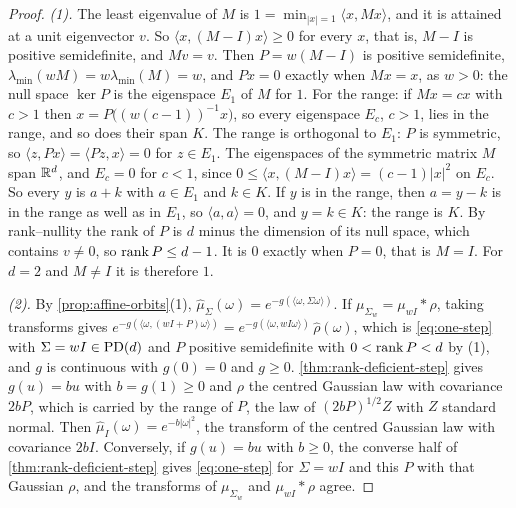 \begin{proof}
\leanok
\emph{(1).} The least eigenvalue of $M$ is $1 = \min_{|x| = 1}\langle x, Mx\rangle$, and it is attained at a unit eigenvector $v$. So $\langle x, (M - I)x\rangle \ge 0$ for
every $x$, that is, $M - I$ is positive semidefinite, and $Mv = v$. Then $P = w(M - I)$ is positive
semidefinite, $\lambda_{\min}(wM) = w\lambda_{\min}(M) = w$, and $Px = 0$ exactly when $Mx = x$, as
$w > 0$: the null space $\ker P$ is the eigenspace $E_1$ of $M$ for $1$. For the range: if $Mx = cx$ with
$c > 1$ then $x = P\bigl((w(c-1))^{-1}x\bigr)$, so every eigenspace $E_c$, $c > 1$, lies in the range,
and so does their span $K$. The range is orthogonal to $E_1$: $P$ is symmetric, so
$\langle z, Px\rangle = \langle Pz, x\rangle = 0$ for $z \in E_1$. The eigenspaces of
the symmetric matrix $M$ span $\mathbb{R}^d$, and $E_c = 0$ for $c < 1$, since
$0 \le \langle x, (M - I)x\rangle = (c - 1)|x|^2$ on $E_c$. So every $y$ is $a + k$ with $a \in E_1$ and
$k \in K$. If $y$ is in the range, then $a = y - k$ is in the range as well as in $E_1$, so
$\langle a, a\rangle = 0$, and $y = k \in K$: the range is $K$. By rank--nullity the rank of $P$ is $d$
minus the dimension of its null space, which contains $v \ne 0$, so $\operatorname{rank} P \le d - 1$. It is
$0$ exactly when $P = 0$, that is $M = I$. For $d = 2$ and $M \ne I$ it is therefore $1$.

\emph{(2).} By \ref{prop:affine-orbits}(1), $\widehat\mu_\Sigma(\omega) = e^{-g(\langle\omega,\Sigma\omega\rangle)}$.
If $\mu_{\Sigma_w} = \mu_{wI} * \rho$, taking transforms gives
$e^{-g(\langle\omega,(wI + P)\omega\rangle)} = e^{-g(\langle\omega,wI\omega\rangle)}\,\widehat\rho(\omega)$, which is
\ref{eq:one-step} with $\Sigma = wI \in \mathrm{PD}(d)$ and $P$ positive semidefinite with $0 < \operatorname{rank} P < d$ by
(1), and $g$ is continuous with $g(0) = 0$ and $g \ge 0$. \ref{thm:rank-deficient-step} gives $g(u) = bu$ with
$b = g(1) \ge 0$ and $\rho$ the centred Gaussian law with covariance $2bP$, which is carried by the range
of $P$, the law of $(2bP)^{1/2}Z$ with $Z$ standard normal. Then $\widehat\mu_I(\omega) = e^{-b|\omega|^2}$,
the transform of the centred Gaussian law with covariance $2bI$. Conversely, if $g(u) = bu$ with
$b \ge 0$, the converse half of \ref{thm:rank-deficient-step} gives \ref{eq:one-step} for $\Sigma = wI$ and
this $P$ with that Gaussian $\rho$, and the transforms of $\mu_{\Sigma_w}$ and $\mu_{wI} * \rho$ agree.


\end{proof}
